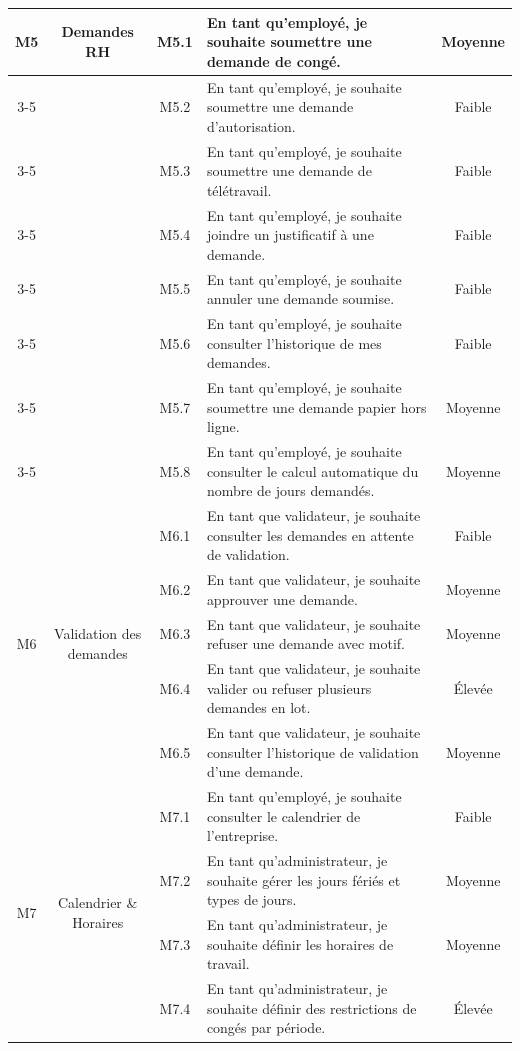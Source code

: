 \begin{longtable}{|c|c|c|p{7.2cm}|c|}
\multirow{8}{*}{M5} & \multirow{8}{*}{Demandes RH} & M5.1 & En tant qu'employé, je souhaite soumettre une demande de congé. & Moyenne \\
\cline{3-5}
 & & M5.2 & En tant qu'employé, je souhaite soumettre une demande d'autorisation. & Faible \\
\cline{3-5}
 & & M5.3 & En tant qu'employé, je souhaite soumettre une demande de télétravail. & Faible \\
\cline{3-5}
 & & M5.4 & En tant qu'employé, je souhaite joindre un justificatif à une demande. & Faible \\
\cline{3-5}
 & & M5.5 & En tant qu'employé, je souhaite annuler une demande soumise. & Faible \\
\cline{3-5}
 & & M5.6 & En tant qu'employé, je souhaite consulter l'historique de mes demandes. & Faible \\
\cline{3-5}
 & & M5.7 & En tant qu'employé, je souhaite soumettre une demande papier hors ligne. & Moyenne \\
\cline{3-5}
 & & M5.8 & En tant qu'employé, je souhaite consulter le calcul automatique du nombre de jours demandés. & Moyenne \\
\hline
\multirow{5}{*}{M6} & \multirow{5}{*}{Validation des demandes} & M6.1 & En tant que validateur, je souhaite consulter les demandes en attente de validation. & Faible \\
\cline{3-5}
 & & M6.2 & En tant que validateur, je souhaite approuver une demande. & Moyenne \\
\cline{3-5}
 & & M6.3 & En tant que validateur, je souhaite refuser une demande avec motif. & Moyenne \\
\cline{3-5}
 & & M6.4 & En tant que validateur, je souhaite valider ou refuser plusieurs demandes en lot. & Élevée \\
\cline{3-5}
 & & M6.5 & En tant que validateur, je souhaite consulter l'historique de validation d'une demande. & Moyenne \\
\hline
\multirow{5}{*}{M7} & \multirow{5}{*}{Calendrier \& Horaires} & M7.1 & En tant qu'employé, je souhaite consulter le calendrier de l'entreprise. & Faible \\
\cline{3-5}
 & & M7.2 & En tant qu'administrateur, je souhaite gérer les jours fériés et types de jours. & Moyenne \\
\cline{3-5}
 & & M7.3 & En tant qu'administrateur, je souhaite définir les horaires de travail. & Moyenne \\
\cline{3-5}
 & & M7.4 & En tant qu'administrateur, je souhaite définir des restrictions de congés par période. & Élevée \\

\end{longtable}
